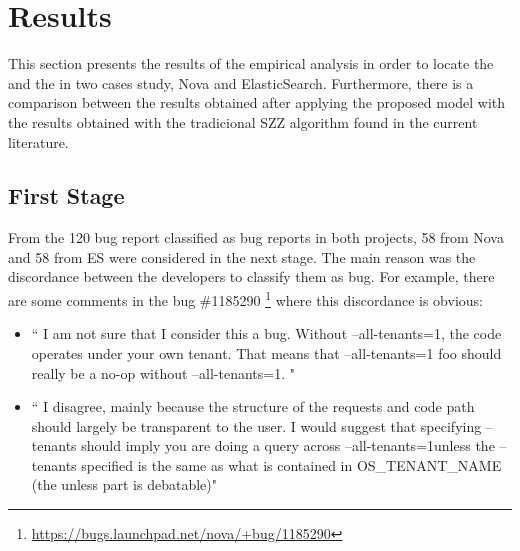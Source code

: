 \documentclass[a4paper, 12pt]{book}
\begin{document}
%
%

\section{Results}
\label{sec:results}
This section presents the results of the empirical analysis in order to locate the \BIC and the \FFC in two cases study, Nova and ElasticSearch. Furthermore, there is a comparison between the results obtained after applying the proposed model with the results obtained with the tradicional SZZ algorithm found in the current literature.

\subsection{First Stage}
\label{sec:resultsFS}


From the 120 bug report classified as bug reports in both projects, 58 from Nova and 58 from ES were considered in the next stage. The main reason was the discordance between the developers to classify them as bug. For example, there are some comments in the bug \#1185290 \footnote{\url{https://bugs.launchpad.net/nova/+bug/1185290}} where this discordance is obvious:
	\begin{itemize}
		\item `` I am not sure that I consider this a bug. Without --all-tenants=1, the code operates under your own tenant. That means that --all-tenants=1 foo should really be a no-op without --all-tenants=1. "
		\item `` I disagree, mainly because the structure of the requests and code path should largely be transparent to the user. I would suggest that specifying --tenants should imply you are doing a query across --all-tenants=1unless the --tenants specified is the same as what is contained in OS\_TENANT\_NAME (the unless part is debatable)"
	\end{itemize}
\end{document}
